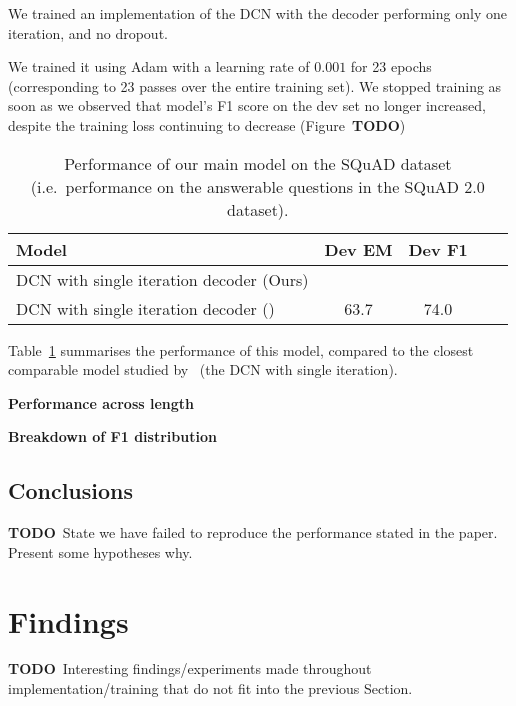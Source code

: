 \documentclass[a4paper, 10pt, conference]{article}
\newcommand{\TODO}{{\color{red}\textbf{TODO}}}
\begin{document}

We trained an implementation of the DCN with the decoder performing only one iteration, and no dropout. 

We trained it using Adam with a learning rate of $0.001$ for 23 epochs (corresponding to 23 passes over the entire training set).
We stopped training as soon as we observed that model's F1 score on the dev set no longer increased, despite the training loss continuing to decrease (Figure~\TODO\textbf{})

\begin{table}[h]
\begin{center}
\begin{tabular}{l c c c c}
\toprule
Model                                           & Dev EM        & Dev F1 \\
\midrule
DCN with single iteration decoder (Ours)        &               &     \\
DCN with single iteration decoder (\cite{dcn})  & 63.7          & 74.0\\
\bottomrule
\end{tabular}
\end{center}
\caption{Performance of our main model on the SQuAD dataset (i.e.\ performance on the answerable questions in the SQuAD 2.0 dataset).}
\label{table:main-results}
\end{table}

Table~\ref{table:main-results} summarises the performance of this model, compared to the closest comparable model studied by~\cite{dcn} (the DCN with single iteration).

\textbf{Performance across length}

\textbf{Breakdown of F1 distribution}

\subsection{Conclusions}

\TODO\ State we have failed to reproduce the performance stated in the paper. Present some hypotheses why.

\section{Findings}

\TODO\ Interesting findings/experiments made throughout implementation/training that do not fit into the previous Section.
\end{document}

